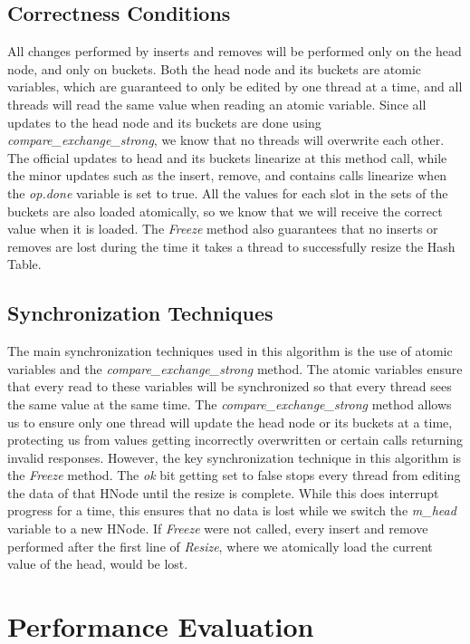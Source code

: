 \documentclass[11pt]{article} %
\begin{document}
\subsection{Correctness Conditions}

All changes performed by inserts and removes will be performed only on the head node, and only on buckets. Both the head node and its buckets are atomic variables, which are guaranteed to only be edited by one thread at a time, and all threads will read the same value when reading an atomic variable. Since all updates to the head node and its buckets are done using  \textit{compare\_exchange\_strong}, we know that no threads will overwrite each other. The official updates to head and its buckets linearize at this method call, while the minor updates such as the insert, remove, and contains calls linearize when the \textit{op.done} variable is set to true. All the values for each slot in the sets of the buckets are also loaded atomically, so we know that we will receive the correct value when it is loaded. The \textit{Freeze} method also guarantees that no inserts or removes are lost during the time it takes a thread to successfully resize the Hash Table.


\subsection{Synchronization Techniques}

The main synchronization techniques used in this algorithm is the use of atomic variables and the \textit{compare\_exchange\_strong} method. The atomic variables ensure that every read to these variables will be synchronized so that every thread sees the same value at the same time. The \textit{compare\_exchange\_strong} method allows us to ensure only one thread will update the head node or its buckets at a time, protecting us from values getting incorrectly overwritten or certain calls returning invalid responses. However, the key synchronization technique in this algorithm is the \textit{Freeze} method. The \textit{ok} bit getting set to false stops every thread from editing the data of that HNode until the resize is complete. While this does interrupt progress for a time, this ensures that no data is lost while we switch the \textit{m\_head} variable to a new HNode. If \textit{Freeze} were not called, every insert and remove performed after the first line of \textit{Resize}, where we atomically load the current value of the head, would be lost.

\section{Performance Evaluation}
\end{document}
